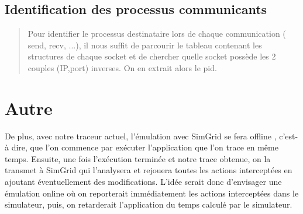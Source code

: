 \documentclass{article}
\begin{document}
\subsection{Identification des processus communicants}
\begin{quotation}
Pour identifier le processus destinataire lors de chaque communication ( send,
recv, ...), il nous suffit de parcourir le tableau contenant les structures de
chaque socket et de chercher quelle socket possède les 2 couples (IP,port)
inverses. On en extrait alors le pid.
\end{quotation}

\section{Autre}
De plus, avec notre traceur actuel, l’émulation avec SimGrid se fera offline ,
c’est-à dire, que l’on commence par exécuter l’application que l’on trace en
même temps. Ensuite, une fois l’exécution terminée et notre trace obtenue, on la
transmet à SimGrid qui l’analysera et rejouera toutes les actions interceptées
en ajoutant éventuellement des modifications. L’idée serait donc d’envisager une
émulation online où on reporterait immédiatement les actions interceptées dans
le simulateur, puis, on retarderait l’application du temps calculé par le
simulateur.
\end{document}
